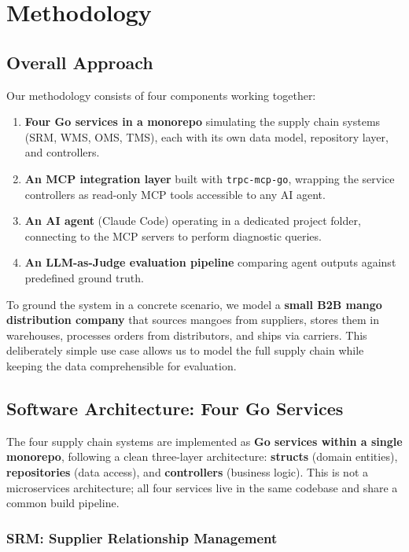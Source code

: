 \documentclass[12pt,a4paper]{report}
\begin{document}
\chapter{Methodology}

\section{Overall Approach}

Our methodology consists of four components working together:

\begin{enumerate}[itemsep=0.3em]
    \item \textbf{Four Go services in a monorepo} simulating the supply chain systems (SRM, WMS, OMS, TMS), each with its own data model, repository layer, and controllers.
    \item \textbf{An MCP integration layer} built with \texttt{trpc-mcp-go}, wrapping the service controllers as read-only MCP tools accessible to any AI agent.
    \item \textbf{An AI agent} (Claude Code) operating in a dedicated project folder, connecting to the MCP servers to perform diagnostic queries.
    \item \textbf{An LLM-as-Judge evaluation pipeline} comparing agent outputs against predefined ground truth.
\end{enumerate}

To ground the system in a concrete scenario, we model a \textbf{small B2B mango distribution company} that sources mangoes from suppliers, stores them in warehouses, processes orders from distributors, and ships via carriers. This deliberately simple use case allows us to model the full supply chain while keeping the data comprehensible for evaluation.

\section{Software Architecture: Four Go Services}

The four supply chain systems are implemented as \textbf{Go services within a single monorepo}, following a clean three-layer architecture: \textbf{structs} (domain entities), \textbf{repositories} (data access), and \textbf{controllers} (business logic). This is not a microservices architecture; all four services live in the same codebase and share a common build pipeline.

\subsection{SRM: Supplier Relationship Management}
\end{document}
